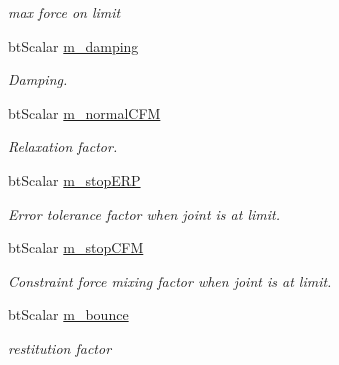 \begin{Indent}{\bf }
\begin{CompactItemize}
\begin{CompactList}\small\item\em max force on limit \item\end{CompactList}\item 
\hypertarget{classbt_rotational_limit_motor_4aaabbd7dac171217b2ac36c3f2bc240}{
btScalar \hyperlink{classbt_rotational_limit_motor_4aaabbd7dac171217b2ac36c3f2bc240}{m\_\-damping}}
\label{classbt_rotational_limit_motor_4aaabbd7dac171217b2ac36c3f2bc240}

\begin{CompactList}\small\item\em Damping. \item\end{CompactList}\item 
btScalar \hyperlink{classbt_rotational_limit_motor_3d06f5a5de013fd97f39cf63273dce45}{m\_\-normalCFM}
\begin{CompactList}\small\item\em Relaxation factor. \item\end{CompactList}\item 
\hypertarget{classbt_rotational_limit_motor_88139c248dfa9b9ab4a8a2431e86aa45}{
btScalar \hyperlink{classbt_rotational_limit_motor_88139c248dfa9b9ab4a8a2431e86aa45}{m\_\-stopERP}}
\label{classbt_rotational_limit_motor_88139c248dfa9b9ab4a8a2431e86aa45}

\begin{CompactList}\small\item\em Error tolerance factor when joint is at limit. \item\end{CompactList}\item 
\hypertarget{classbt_rotational_limit_motor_e2f949d3de4c3b059cd914e11fd5ebcd}{
btScalar \hyperlink{classbt_rotational_limit_motor_e2f949d3de4c3b059cd914e11fd5ebcd}{m\_\-stopCFM}}
\label{classbt_rotational_limit_motor_e2f949d3de4c3b059cd914e11fd5ebcd}

\begin{CompactList}\small\item\em Constraint force mixing factor when joint is at limit. \item\end{CompactList}\item 
\hypertarget{classbt_rotational_limit_motor_4cfd3d5d8d3ba75f1ce4b59f01017364}{
btScalar \hyperlink{classbt_rotational_limit_motor_4cfd3d5d8d3ba75f1ce4b59f01017364}{m\_\-bounce}}
\label{classbt_rotational_limit_motor_4cfd3d5d8d3ba75f1ce4b59f01017364}

\begin{CompactList}\small\item\em restitution factor \item\end{CompactList}\end{CompactItemize}
\end{Indent}
